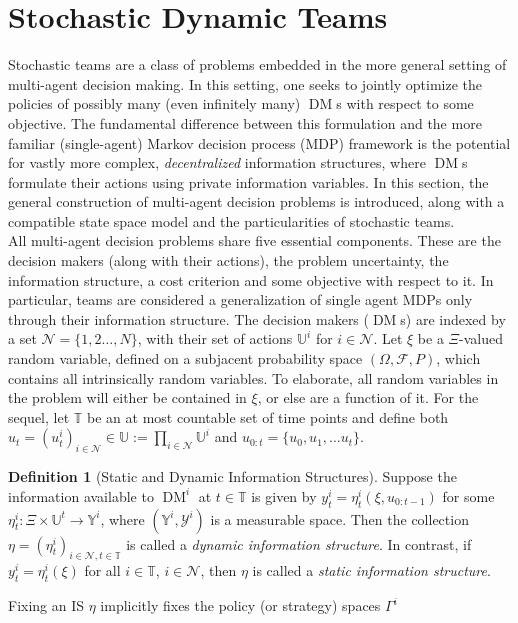 \documentclass[12pt, oneside]{report}
\newcommand{\mbb}[1]{\mathbb{#1}}
\newcommand{\1}[1]{\mathbbm{1}_{\{#1\}}}
\newcommand{\mc}[1]{\mathcal{#1}}
\DeclareMathOperator{\DM}{DM} \DeclareMathOperator{\argmin}{argmin}
\theoremstyle{definition}
\newtheorem{definition}[theorem]{Definition}
\begin{document}
\section{Stochastic Dynamic Teams}\label{app2}
Stochastic teams are a class of problems embedded in the more general setting of
multi-agent decision making. In this setting, one seeks to jointly optimize the
policies of possibly many (even infinitely many) $\DM$s with respect to some
objective. The fundamental difference between this formulation and the more
familiar (single-agent) Markov decision process (MDP) framework is the potential
for vastly more complex, {\it decentralized} information structures, where
$\DM$s formulate their actions using private information variables. In this section,
the general construction of multi-agent decision problems is introduced, along with
a compatible state space model and the particularities of stochastic teams.\\[5pt]
\indent All multi-agent decision problems share five essential components. These
are the decision makers (along with their actions), the problem uncertainty, the
information structure, a cost criterion and some objective with respect to it.
In particular, teams are considered a generalization of single agent MDPs only through
their information structure.
The decision makers ($\DM$s) are indexed by a set $\mc{N}=\{1,2\dots,N\}$, with
their set of actions $\mbb{U}^i$ for $i\in\mc{N}$. Let $\xi$ be a $\Xi$-valued
random variable, defined on a subjacent probability space
$(\Omega,\mc{F},P)$, which contains all intrinsically random variables. To
elaborate, all random variables in the problem will either be contained in
$\xi$, or else are a function of it. For the sequel, let $\mbb{T}$ be an at most countable
set of time points and define both
$u_t=(u^i_t)_{i\in\mc{N}}\in\mbb{U}:=\prod_{i\in\mc{N}}\mbb{U}^i$ and
$u_{0:t}=\{u_0,u_1,\dots u_t\}$. 
\begin{definition}[Static and Dynamic Information Structures]\label{def1}
    Suppose the information available to $\DM^i$ at $t\in\mbb{T}$ is given by
    $y^i_t=\eta^i_t(\xi,u_{0:t-1})$ for some
    $\eta^i_t:\Xi\times\mbb{U}^{t}\rightarrow \mbb{Y}^i$, where
    $(\mbb{Y}^i,\mc{Y}^i)$ is a measurable space. Then the collection
    $\eta=(\eta^i_t)_{i\in\mc{N},t\in\mbb{T}}$ is called a {\it dynamic
    information structure}. In contrast, if $y^i_t=\eta^i_t(\xi)$ for all
    $i\in\mbb{T}$, $i\in\mc{N}$, then $\eta$ is called a {\it static information
    structure}.
\end{definition}
Fixing an IS $\eta$ implicitly fixes the policy (or strategy) spaces $\Gamma^i$
\end{document}
